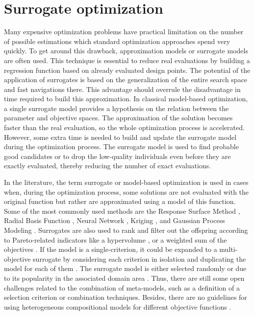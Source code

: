    \section{Surrogate optimization} 
        Many expensive optimization problems have practical limitation on the number of possible estimations which standard optimization approaches spend very quickly. To get around this drawback, approximation models or surrogate models are often used. This technique is essential to reduce real evaluations by building a regression function based on already evaluated design points.
        The potential of the application of surrogates is based on the generalization of the entire search space and fast navigations there. This advantage should overrule the disadvantage in time required to build this approximation. In classical model-based optimization, a single surrogate model provides a hypothesis on the relation between the parameter and objective spaces. The approximation of the solution becomes faster than the real evaluation, so the whole optimization process is accelerated. However, some extra time is needed to build and update the surrogate model during the optimization process. The surrogate model is used to find probable good candidates or to drop the low-quality individuals even before they are exactly evaluated, thereby reducing the number of exact evaluations.

        In the literature, the term surrogate or model-based optimization is used in cases when, during the optimization process, some solutions are not evaluated with the original function but rather are approximated using a model of this function. Some of the most commonly used methods are the Response Surface Method \cite{ResponseSurface}, Radial Basis Function \cite{Rasmussen2004}, Neural Network \cite{KOURAKOS201313}, Kriging \cite{Woodard00}, and Gaussian Process Modeling \cite{RasmussenN10, RasmussenW06}. Surrogates are also used to rank and filter out the offspring according to Pareto-related indicators like a hypervolume \cite{EmmerichGN06}, or a weighted sum of the objectives \cite{TaboadaBCW07}. If the model is a single-criterion, it could be expanded to a multi-objective surrogate by considering each criterion in isolation and duplicating the model for each of them \cite{Knowles06, nardi2019practical}. The surrogate model is either selected randomly or due to its popularity in the associated domain area \cite{SoftSurvey}. Thus, there are still some open challenges related to the combination of meta-models, such as a definition of a selection criterion or combination techniques. Besides, there are no guidelines for using heterogeneous compositional models for different objective functions \cite{SoftSurvey}.

